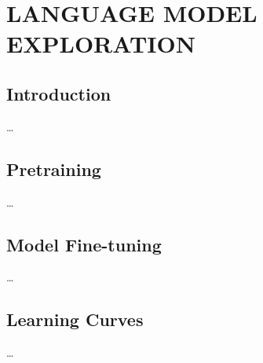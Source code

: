 

\section{LANGUAGE MODEL EXPLORATION}


    \subsection{Introduction}
    
        \ldots
    
    \subsection{Pretraining}
    
        \ldots
        
    \subsection{Model Fine-tuning}
    
        \ldots
            
    \subsection{Learning Curves}
    
        \ldots
